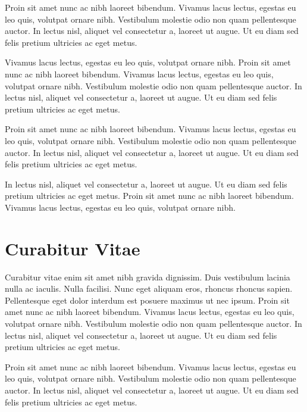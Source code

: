 Proin sit amet nunc ac nibh laoreet bibendum. Vivamus lacus lectus, egestas eu leo quis, volutpat ornare nibh. Vestibulum molestie odio non quam pellentesque auctor. In lectus nisl, aliquet vel consectetur a, laoreet ut augue. Ut eu diam sed felis pretium ultricies ac eget metus.



Vivamus lacus lectus, egestas eu leo quis, volutpat ornare nibh. Proin sit amet nunc ac nibh laoreet bibendum. Vivamus lacus lectus, egestas eu leo quis, volutpat ornare nibh. Vestibulum molestie odio non quam pellentesque auctor. In lectus nisl, aliquet vel consectetur a, laoreet ut augue. Ut eu diam sed felis pretium ultricies ac eget metus.


\begin{corollary}
Proin sit amet nunc ac nibh laoreet bibendum. Vivamus lacus lectus, egestas eu leo quis, volutpat ornare nibh. Vestibulum molestie odio non quam pellentesque auctor. In lectus nisl, aliquet vel consectetur a, laoreet ut augue. Ut eu diam sed felis pretium ultricies ac eget metus.	
\end{corollary}

\begin{corollary}
In lectus nisl, aliquet vel consectetur a, laoreet ut augue. Ut eu diam sed felis pretium ultricies ac eget metus. Proin sit amet nunc ac nibh laoreet bibendum. Vivamus lacus lectus, egestas eu leo quis, volutpat ornare nibh.	
\end{corollary}

\section{Curabitur Vitae}

Curabitur vitae enim sit amet nibh gravida dignissim. Duis vestibulum lacinia nulla ac iaculis. Nulla facilisi. Nunc eget aliquam eros, rhoncus rhoncus sapien. Pellentesque eget dolor interdum est posuere maximus ut nec ipsum. Proin sit amet nunc ac nibh laoreet bibendum. Vivamus lacus lectus, egestas eu leo quis, volutpat ornare nibh. Vestibulum molestie odio non quam pellentesque auctor. In lectus nisl, aliquet vel consectetur a, laoreet ut augue. Ut eu diam sed felis pretium ultricies ac eget metus.

Proin sit amet nunc ac nibh laoreet bibendum. Vivamus lacus lectus, egestas eu leo quis, volutpat ornare nibh. Vestibulum molestie odio non quam pellentesque auctor. In lectus nisl, aliquet vel consectetur a, laoreet ut augue. Ut eu diam sed felis pretium ultricies ac eget metus.

